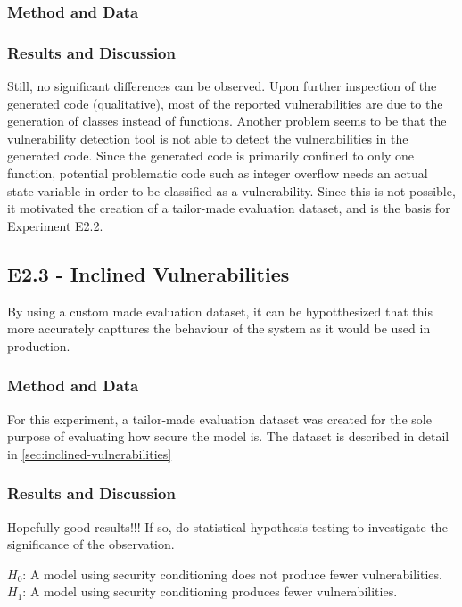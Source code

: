 \subsubsection{Method and Data}

\subsubsection{Results and Discussion}
Still, no significant differences can be observed. Upon further inspection of the generated code (qualitative), most of the reported vulnerabilities are due to the generation of classes instead of functions. Another problem seems to be that the vulnerability detection tool is not able to detect the vulnerabilities in the generated code. Since the generated code is primarily confined to only one function, potential problematic code such as integer overflow needs an actual state variable in order to be classified as a vulnerability. Since this is not possible, it motivated the creation of a tailor-made evaluation dataset, and is the basis for Experiment E2.2.


\subsection{E2.3 - Inclined Vulnerabilities}
\label{sec:e2.3-inclined-vulnerabilities}
By using a custom made evaluation dataset, it can be hypotthesized that this more accurately capttures the behaviour of the system as it would be used in production.

\subsubsection{Method and Data}
For this experiment, a tailor-made evaluation dataset was created for the sole purpose of evaluating how secure the model is. The dataset is described in detail in \cref{sec:inclined-vulnerabilities}

\subsubsection{Results and Discussion}
Hopefully good results!!! If so, do statistical hypothesis testing to investigate the significance of the observation.

\textbf{\(H_0\)}: A model using security conditioning does not produce fewer vulnerabilities. 
\textbf{\(H_1\)}: A model using security conditioning produces fewer vulnerabilities.


